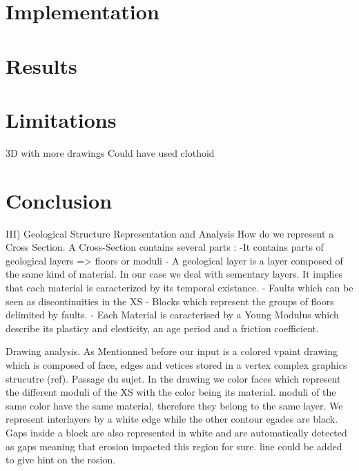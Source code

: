 \documentclass[12pt, a4paper]{memoir} %
\begin{document}
\section{Implementation}
\section{Results}
\section{Limitations}
3D with more drawings
Could have used clothoid
\section{Conclusion}


III) Geological Structure Representation and Analysis
	How do we represent a Cross Section.
	A Cross-Section contains several parts : 
		-It contains parts of geological layers => floors or moduli
		- A geological layer is a layer composed of the same kind of material.
		In our case we deal with sementary layers. It implies that each material is caracterized by its temporal existance.	
	   	- Faults which can be seen as discontinuities in the XS
		- Blocks which represent the groups of floors delimited by faults.
		- Each Material is caracterised by a Young Modulus which describe its plasticy and elesticity,
		an age period and a friction coefficient.

Drawing analysis. As Mentionned before our input is a colored vpaint drawing which is composed of face, edges and vetices stored in 
a vertex complex graphics strucutre (ref). Passage du sujet.
In the drawing we color faces which represent the different moduli of the XS with the color being its material. moduli of the same color have the same material, therefore they belong to the same layer. We represent interlayers by a white edge while the other contour egades are black. Gaps inside a block are also represented in white and are automatically detected as gaps meaning that erosion impacted this region for sure. line could be added to give hint on the rosion.
\end{document}
